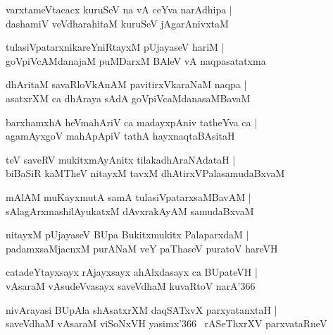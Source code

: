 \documentclass[twoside,12pt,openright]{book}
\newcounter{shloka}[chapter]
\begin{document}
\begin{shloka}%
varxtameVtacacx kuruSeV na vA ceYva narAdhipa |\\
dashamiV veVdharahitaM kuruSeV jAgarAnivxtaM 
\end{shloka}

\begin{shloka}%
tulasiVpatarxnikareYniRtayxM pUjayaseV hariM |\\
goVpiVcAMdanajaM puMDarxM BAleV vA naqpasatatxma
\end{shloka}

\begin{shloka}%
dhAritaM savaRloVkAnAM pavitirxVkaraNaM naqpa |\\
asatxrXM ca dhAraya sAdA goVpiVcaMdanasaMBavaM 
\end{shloka}

\begin{shloka}%
barxhamxhA heVmahAriV ca madayxpAniv tatheYva ca |\\
agamAyxgoV mahApApiV tathA hayxnaqtaBAsitaH 
\end{shloka}

\begin{shloka}%
teV saveRV mukitxmAyAnitx tilakadhAraNAdataH |\\
biBaSiR kaMTheV nitayxM tavxM dhAtirxVPalasamudaBxvaM 
\end{shloka}

\begin{shloka}%
mAlAM muKayxmutA samA tulasiVpatarxsaMBavAM |\\
sAlagArxmashilAyukatxM dAvxrakAyAM samudaBxvaM 
\end{shloka}

\begin{shloka}%
nitayxM pUjayaseV BUpa Bukitxmukitx PalaparxdaM |\\
padamxsaMjacnxM purANaM veY paThaseV puratoV hareVH 
\end{shloka}

\begin{shloka}%
catadeYtayxsayx rAjayxsayx ahAlxdasayx ca BUpateVH |\\
vAsaraM vAsudeVvasayx saveVdhaM kuvaRtoV narA\char'366 
\end{shloka}

\begin{shloka}%
nivArayasi BUpAla shAsatxrXM daqSATxvX parxyatanxtaH |\\
saveVdhaM vAsaraM viSoNxVH yasimx\char'366 ~rASeThxrXV parxvataRneV
\end{shloka}
\end{document}
